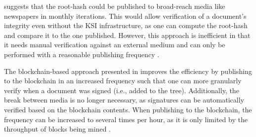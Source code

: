 \cite{hutchison_keyless_2013} suggests that the root-hash could be published to broad-reach media like newspapers in monthly iterations. This would allow verification of a document's integrity even without the KSI infrastructure, as one can compute the root-hash and compare it to the one published. However, this approach is inefficient in that it needs manual verification against an external medium and can only be performed with a reasonable publishing frequency \cite{jamthagen_blockchain-based_2016}.

The blockchain-based approach presented in \cite{jamthagen_blockchain-based_2016} improves the efficiency by publishing to the blockchain in an increased frequency such that one can more granularly verify when a document was signed (i.e., added to the tree). Additionally, the break between media is no longer necessary, as signatures can be automatically verified based on the blockchain contents. When publishing to the blockchain, the frequency can be increased to several times per hour, as it is only limited by the throughput of blocks being mined \cite{jamthagen_blockchain-based_2016}.
